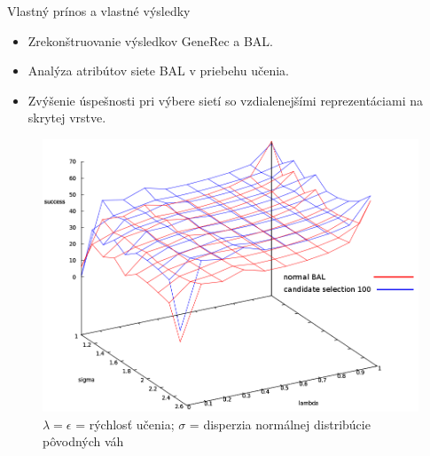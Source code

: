 \documentclass[xcolor=dvipsnames]{beamer}
\begin{document}
\begin{frame}{Vlastný prínos a vlastné výsledky}
  \begin{itemize}
    \item Zrekonštruovanie výsledkov GeneRec a BAL. 
    \item Analýza atribútov siete BAL v priebehu učenia. 
    \item Zvýšenie úspešnosti pri výbere sietí so vzdialenejšími reprezentáciami na skrytej vrstve. 
  \end{itemize} 
  
  \begin{figure}[h!]  
    \centering
    \vspace{-8pt} 
    \includegraphics[scale=0.20]{img/compare_normal_and_hdist2.png}
    \caption{{\tiny $\lambda = \epsilon$ = rýchlosť učenia; $\sigma$ = disperzia normálnej distribúcie pôvodných váh}} 
  \end{figure} 
\end{frame}


\end{document}
